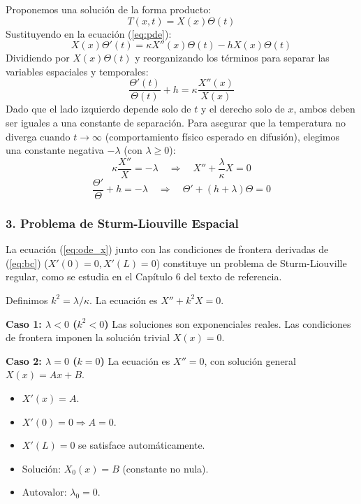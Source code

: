 \documentclass[a4paper]{article}
\begin{document}
Proponemos una solución de la forma producto:
\begin{equation}
T(x, t) = X(x)\Theta(t)
\end{equation}
Sustituyendo en la ecuación (\ref{eq:pde}):
\begin{equation}
X(x)\Theta'(t) = \kappa X''(x)\Theta(t) - hX(x)\Theta(t)
\end{equation}
Dividiendo por $X(x)\Theta(t)$ y reorganizando los términos para separar las variables espaciales y temporales:
\begin{equation}
\frac{\Theta'(t)}{\Theta(t)} + h = \kappa \frac{X''(x)}{X(x)}
\end{equation}
Dado que el lado izquierdo depende solo de $t$ y el derecho solo de $x$, ambos deben ser iguales a una constante de separación. Para asegurar que la temperatura no diverga cuando $t \to \infty$ (comportamiento físico esperado en difusión), elegimos una constante negativa $-\lambda$ (con $\lambda \geq 0$):
\begin{equation}
\kappa \frac{X''}{X} = -\lambda \quad \Rightarrow \quad X'' + \frac{\lambda}{\kappa}X = 0
\label{eq:ode_x}
\end{equation}
\begin{equation}
\frac{\Theta'}{\Theta} + h = -\lambda \quad \Rightarrow \quad \Theta' + (h + \lambda)\Theta = 0
\label{eq:ode_t}
\end{equation}

\subsubsection{3. Problema de Sturm-Liouville Espacial}

La ecuación (\ref{eq:ode_x}) junto con las condiciones de frontera derivadas de (\ref{eq:bc}) ($X'(0)=0, X'(L)=0$) constituye un problema de Sturm-Liouville regular, como se estudia en el Capítulo 6 del texto de referencia.

Definimos $k^2 = \lambda/\kappa$. La ecuación es $X'' + k^2 X = 0$.

\textbf{Caso 1: $\lambda < 0$ ($k^2 < 0$)}
Las soluciones son exponenciales reales. Las condiciones de frontera imponen la solución trivial $X(x)=0$.

\textbf{Caso 2: $\lambda = 0$ ($k = 0$)}
La ecuación es $X'' = 0$, con solución general $X(x) = Ax + B$.
\begin{itemize}
    \item $X'(x) = A$.
    \item $X'(0) = 0 \Rightarrow A = 0$.
    \item $X'(L) = 0$ se satisface automáticamente.
    \item Solución: $X_0(x) = B$ (constante no nula).
    \item Autovalor: $\lambda_0 = 0$.
\end{itemize}
\end{document}
